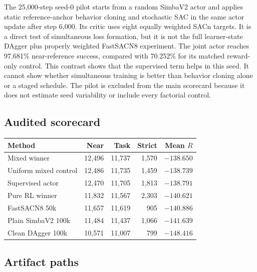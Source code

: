 \documentclass[10pt,twocolumn]{article}
\begin{document}
The 25,000-step seed-0 pilot starts from a random SimbaV2 actor and applies static reference-anchor behavior cloning and stochastic SAC in the same actor update after step 6,000. Its critic uses eight equally weighted SACn targets. It is a direct test of simultaneous loss formation, but it is not the full learner-state DAgger plus properly weighted FastSACN8 experiment. The joint actor reaches 97.681\% near-reference success, compared with 70.252\% for its matched reward-only control. This contrast shows that the supervised term helps in this seed. It cannot show whether simultaneous training is better than behavior cloning alone or a staged schedule. The pilot is excluded from the main scorecard because it does not estimate seed variability or include every factorial control.

\subsection{Audited scorecard}

\begin{center}
\scriptsize
\begin{tabularx}{\columnwidth}{>{\raggedright\arraybackslash}Xrrrr}
\toprule
Method & Near & Task & Strict & Mean $R$\\
\midrule
Mixed winner & 12,496 & 11,737 & 1,570 & $-138.650$\\
Uniform mixed control & 12,486 & 11,735 & 1,459 & $-138.739$\\
Supervised actor & 12,470 & 11,705 & 1,813 & $-138.791$\\
Pure RL winner & 11,832 & 11,567 & 2,303 & $-140.621$\\
FastSACN8 50k & 11,657 & 11,619 & 905 & $-140.886$\\
Plain SimbaV2 100k & 11,484 & 11,437 & 1,066 & $-141.639$\\
Clean DAgger 100k & 10,571 & 11,007 & 799 & $-148.416$\\
\bottomrule
\end{tabularx}
\end{center}

\subsection{Artifact paths}
\end{document}

